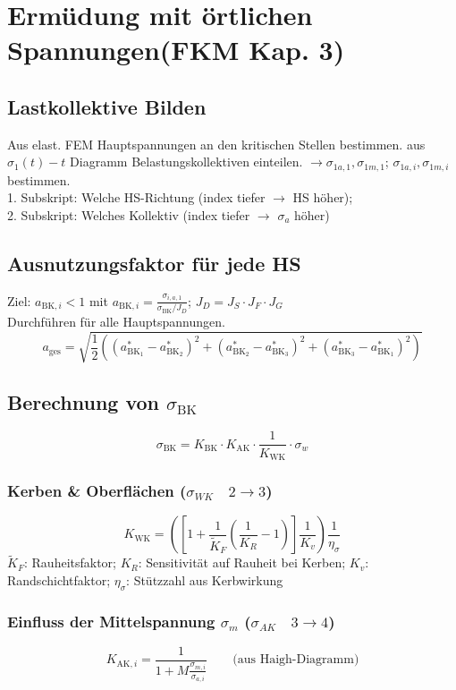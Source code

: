\vspace{-1mm}
\section{Ermüdung mit örtlichen Spannungen(FKM Kap. 3)}
    \subsection{Lastkollektive Bilden}
    Aus elast. FEM Hauptspannungen an den kritischen Stellen bestimmen.
    aus $\sigma_1(t)-t$ Diagramm Belastungskollektiven einteilen. $\rightarrow \sigma_{1a,1}, \sigma_{1m,1}$; $\sigma_{1a,i}, \sigma_{1m,i}$ bestimmen.
    \\1. Subskript: Welche HS-Richtung (index tiefer $\rightarrow$ HS höher); 
    \\2. Subskript: Welches Kollektiv (index tiefer $\rightarrow$ $\sigma_a$ höher)
    \subsection{Ausnutzungsfaktor für jede HS}
        Ziel: $a_{\textrm{BK},i} < 1$ mit $\displaystyle a_{\textrm{BK},i} = \frac{\sigma_{i,a,1}}{\sigma_{\textrm{BK}}/J_D}$; \quad $J_D=J_S\cdot J_F \cdot J_G$ 
        \\Durchführen für alle Hauptspannungen.
        \[a_{\textrm{ges}}=\sqrt{\frac{1}{2}\left((a_{\textrm{BK}_1}^{*}-a_{\textrm{BK}_2}^{*})^{2}+(a_{\textrm{BK}_2}^{*}-a_{\textrm{BK}_3}^{*})^{2}+(a_{\textrm{BK}_3}^{*}-a_{\textrm{BK}_1}^{*})^{2}\right)}\]
    \subsection{Berechnung von $\sigma_{\textrm{BK}}$}
        \[\sigma_{\textrm{BK}} = K_{\textrm{BK}} \cdot K_{\textrm{AK}} \cdot \frac{1}{K_{\textrm{WK}}} \cdot \sigma_w \]
        \subsubsection{Kerben \& Oberflächen ($\sigma_{WK}\quad2\rightarrow3$)}
            \[K_{\textrm{WK}}=\left(\left[1+\frac{1}{\widetilde{K}_F}\left(\frac{1}{K_R}-1\right)\right]\frac{1}{K_v}\right)\frac{1}{\eta_{\sigma}}\]
            $\widetilde{K}_F$: Rauheitsfaktor;   $K_R$: Sensitivität auf Rauheit bei Kerben;     $K_v$: Randschichtfaktor;   $\eta_{\sigma}$: Stützzahl aus Kerbwirkung
        \subsubsection{Einfluss der Mittelspannung $\sigma_m$ ($\sigma_{AK}\quad3\rightarrow4$)}
            \[K_{\textrm{AK},i}=\frac{1}{1+M\frac{\sigma_{m,i}}{\sigma_{a,i}}} \qquad\textrm{(aus Haigh-Diagramm)}\]
        \vspace{-2mm}
